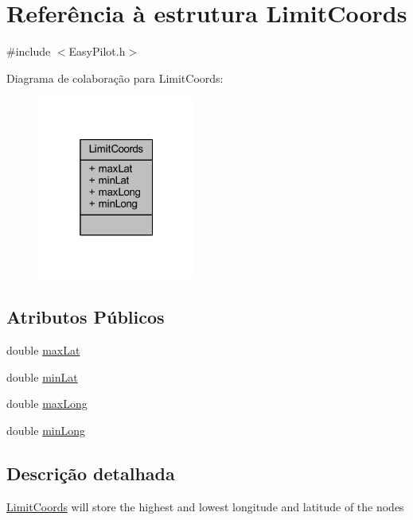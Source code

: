 \hypertarget{struct_limit_coords}{}\section{Referência à estrutura Limit\+Coords}
\label{struct_limit_coords}


{\ttfamily \#include $<$Easy\+Pilot.\+h$>$}



Diagrama de colaboração para Limit\+Coords\+:
\nopagebreak
\begin{figure}[H]
\begin{center}
\leavevmode
\includegraphics[width=148pt]{struct_limit_coords__coll__graph}
\end{center}
\end{figure}
\subsection*{Atributos Públicos}
\begin{DoxyCompactItemize}
\item 
double \hyperlink{struct_limit_coords_a9a0fcf9e011923cb568a1c584a51f654}{max\+Lat}
\item 
double \hyperlink{struct_limit_coords_a1a647ec24500cd353ef30d0de159f0be}{min\+Lat}
\item 
double \hyperlink{struct_limit_coords_aeaddaee7845266a6f234ffd50f748ae4}{max\+Long}
\item 
double \hyperlink{struct_limit_coords_a3ef4041cf2ffec8011de8ff137180895}{min\+Long}
\end{DoxyCompactItemize}


\subsection{Descrição detalhada}
\hyperlink{struct_limit_coords}{Limit\+Coords} will store the highest and lowest longitude and latitude of the nodes 

